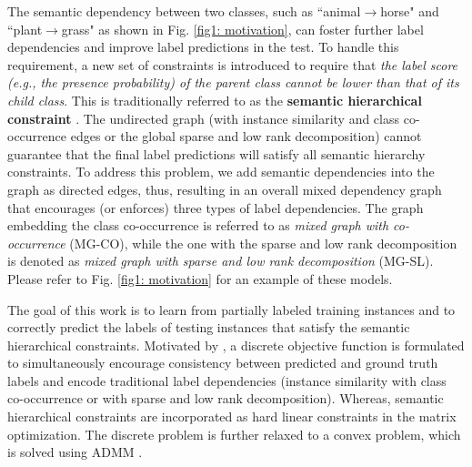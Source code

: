 \documentclass[twocolumn]{svjour3}          %
\begin{document}
The semantic dependency between two classes, such as ``animal$\rightarrow$horse" and ``plant$\rightarrow$grass" as shown in Fig. \ref{fig1: motivation}, can foster further label dependencies and improve label predictions in the test. To handle this requirement, a new set of constraints is introduced to require that {\it the label score ({\it e.g.}, the presence probability) of the parent class cannot be lower than that of its child class}. This is traditionally referred to as the {\bf semantic hierarchical constraint} \cite{bi-wei-icml-2011,my-iccv-2015}. The undirected graph (with instance similarity and class co-occurrence edges or the global sparse and low rank decomposition) cannot guarantee that the final label predictions will satisfy all semantic hierarchy constraints. To address this problem, we add semantic dependencies into the graph as directed edges, thus, resulting in an overall mixed dependency graph that encourages (or enforces) three types of label dependencies. The graph embedding the class co-occurrence is referred to as {\it mixed graph with co-occurrence} (MG-CO), while the one with the sparse and low rank decomposition is denoted as  {\it mixed graph with sparse and low rank decomposition} (MG-SL). 
Please refer to Fig. \ref{fig1: motivation} for an example of these models.



The goal of this work is to learn from partially labeled training instances and to correctly predict the labels of testing instances that satisfy the semantic hierarchical constraints.
Motivated by \cite{my-icpr-2014,my-pr-2015}, a discrete objective function is formulated to simultaneously encourage consistency between predicted and ground truth labels and encode traditional label dependencies (instance similarity with class co-occurrence or with sparse and low rank decomposition). Whereas, semantic hierarchical constraints are incorporated as hard linear constraints in the matrix optimization. The discrete problem is further relaxed to a convex problem, which is solved using ADMM \cite{admm-boyd-2011}.
\end{document}
